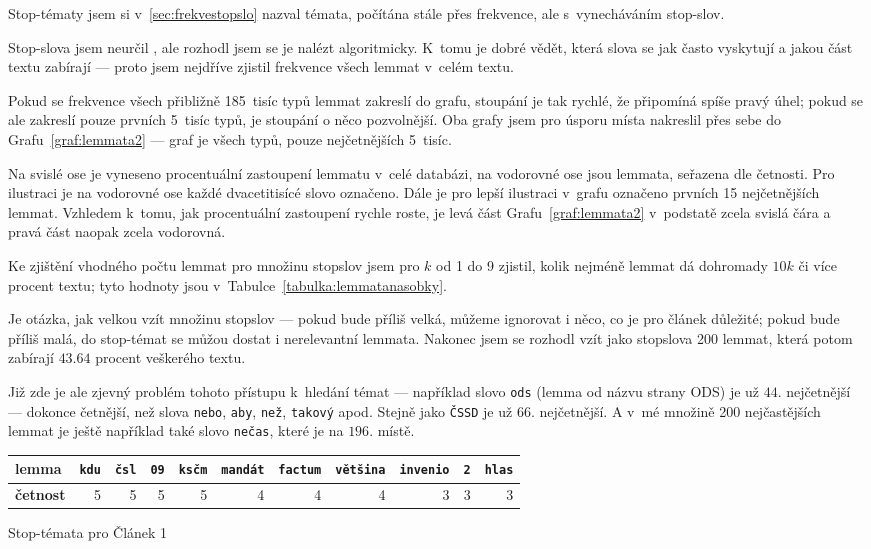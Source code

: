 \documentclass[12pt,a4paper]{report}
\begin{document}

Stop-tématy jsem si v~\ref{sec:frekvestopslo} nazval témata, počítána stále  přes frekvence, ale s~vynecháváním stop-slov.

Stop-slova jsem neurčil , ale rozhodl jsem se je nalézt algoritmicky. K~tomu je dobré vědět, která slova se jak často vyskytují a jakou část textu zabírají --- proto jsem nejdříve zjistil frekvence všech lemmat v~celém textu. 

Pokud se frekvence všech přibližně 185~tisíc typů lemmat zakreslí do grafu, stoupání je tak rychlé, že připomíná spíše pravý úhel; pokud se ale zakreslí pouze prvních 5~tisíc typů, je stoupání o něco pozvolnější. Oba grafy jsem pro úsporu místa nakreslil přes sebe do Grafu~\ref{graf:lemmata2} ---  graf je všech typů,  pouze nejčetnějších 5~tisíc.

Na svislé ose je vyneseno procentuální zastoupení lemmatu v~celé databázi, na vodorovné ose jsou lemmata, seřazena dle četnosti. Pro ilustraci je na vodorovné ose každé dvacetitisícé slovo označeno. Dále je pro lepší ilustraci v~grafu označeno prvních 15 nejčetnějších lemmat. Vzhledem k~tomu, jak procentuální zastoupení rychle roste, je levá část Grafu~\ref{graf:lemmata2} v~podstatě zcela svislá čára a pravá část naopak zcela vodorovná.


Ke zjištění vhodného počtu lemmat pro množinu stopslov jsem pro $k$ od 1 do 9 zjistil, kolik nejméně lemmat dá dohromady $10k$ či více procent textu; tyto hodnoty jsou v~Tabulce~\ref{tabulka:lemmatanasobky}.

Je otázka, jak velkou vzít množinu stopslov --- pokud bude příliš velká, můžeme ignorovat i něco, co je pro článek důležité; pokud bude příliš malá, do stop-témat se můžou dostat i nerelevantní lemmata. Nakonec jsem se rozhodl vzít jako stopslova 200 lemmat, která potom zabírají $43.64$ procent veškerého textu.

Již zde je ale zjevný problém tohoto přístupu k~hledání témat --- například slovo \texttt{ods} (lemma od názvu strany ODS) je už $44.$ nejčetnější --- dokonce četnější, než slova \texttt{nebo}, \texttt{aby}, \texttt{než}, \texttt{takový} apod. Stejně jako \texttt{ČSSD} je už $66.$ nejčetnější. A v~mé množině 200 nejčastějších lemmat je ještě například také slovo \texttt{nečas}, které je na $196.$ místě.


{
    \begin{tabular}{ |l | r |r |r |r |r |r |r |r |r |r | }
        \hline
        \textbf{lemma} & 
        \texttt{kdu} & 
        \texttt{čsl} & 
        \texttt{09} & 
        \texttt{ksčm} & 
        \texttt{mandát} &
        \texttt{factum} & 
        \texttt{většina} & 
        \texttt{invenio} & 
        \texttt{2} & 
        \texttt{hlas} \\ \hline
        
        \textbf{četnost}  & 5 & 5 & 5 & 5 & 4 & 4 & 4 & 3 & 3 & 3 \\ \hline
        
        
      \end{tabular}

}{Stop-témata pro Článek 1}
\end{document}
